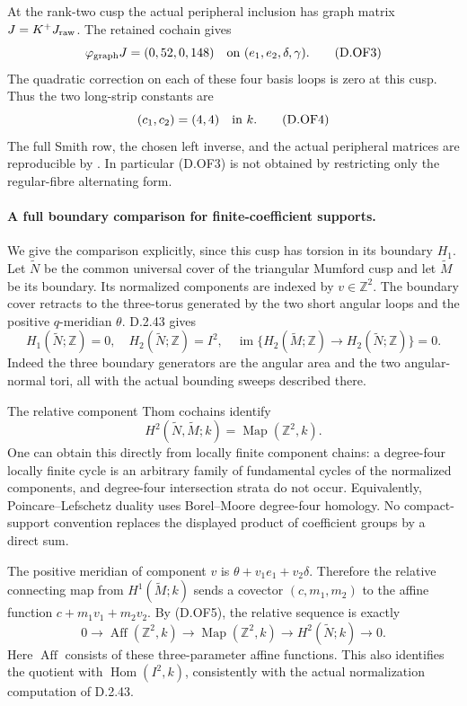 At the rank-two cusp the actual peripheral inclusion has graph
matrix \(J=K^+J_{\rm raw}\). The retained cochain gives
\[
 \varphi_{\rm graph}J=(0,52,0,148)
       \quad\hbox{on }(e_1,e_2,\delta,\gamma).             \tag{D.OF3}
\]
The quadratic correction on each of these four basis loops is zero
at this cusp. Thus the two long-strip constants are
\[
                      (c_1,c_2)=(4,4)\quad\hbox{in }k.   \tag{D.OF4}
\]
The full Smith row, the chosen left inverse, and the actual
peripheral matrices are reproducible by
. In particular (D.OF3) is not
obtained by restricting only the regular-fibre alternating form.

\paragraph{A full boundary comparison for finite-coefficient supports.}
We give the comparison explicitly, since this cusp has torsion in
its boundary \(H_1\). Let \(\widetilde N\) be the common universal
cover of the triangular Mumford cusp and let
\(\widetilde M\) be its boundary. Its normalized components are
indexed by \(v\in\mathbb Z^2\). The boundary cover retracts to the
three-torus generated by the two short angular loops and the positive
\(q\)-meridian \(\theta\). D.2.43 gives
\[
 H_1(\widetilde N;\mathbb Z)=0,\quad
 H_2(\widetilde N;\mathbb Z)=I^2,\quad
 \operatorname{im}\{H_2(\widetilde M;\mathbb Z)\to
                         H_2(\widetilde N;\mathbb Z)\}=0. \tag{D.OF5}
\]
Indeed the three boundary generators are the
angular area and the two angular-normal tori, all with the actual
bounding sweeps described there.

The relative component Thom cochains identify
\[
 H^2(\widetilde N,\widetilde M;k)
                  =\operatorname{Map}(\mathbb Z^2,k).
\]
One can obtain this directly from locally finite
component chains: a degree-four locally finite cycle is an arbitrary
family of fundamental cycles of the normalized components, and
degree-four intersection strata do not occur. Equivalently,
Poincare--Lefschetz duality uses Borel--Moore degree-four homology.
No compact-support convention replaces the displayed product of
coefficient groups by a direct sum.

The positive meridian of component \(v\) is
\(\theta+v_1e_1+v_2\delta\). Therefore the relative connecting map
from \(H^1(\widetilde M;k)\) sends a covector \((c,m_1,m_2)\) to
the affine function \(c+m_1v_1+m_2v_2\). By (D.OF5), the relative
sequence is exactly
\[
 0\longrightarrow\operatorname{Aff}(\mathbb Z^2,k)
 \longrightarrow\operatorname{Map}(\mathbb Z^2,k)
 \longrightarrow H^2(\widetilde N;k)\longrightarrow0.     \tag{D.OF6}
\]
Here \(\operatorname{Aff}\) consists of these three-parameter
affine functions. This also identifies the quotient with
\(\operatorname{Hom}(I^2,k)\), consistently with the actual
normalization computation of D.2.43.

